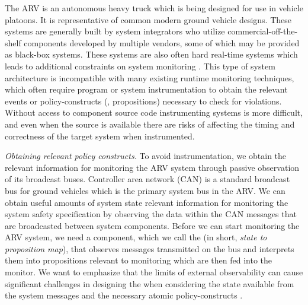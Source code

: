 The ARV is an autonomous heavy truck which is being designed for use in vehicle platoons. It is representative of common modern ground vehicle designs.
These systems are generally built by system integrators who utilize commercial-off-the-shelf components developed by multiple vendors, some of which may be provided as black-box systems.
These systems are also often hard real-time systems which leads to additional constraints on system monitoring \cite{Goodloe2010}.
This type of system architecture is incompatible with many existing runtime monitoring techniques, which often require program or system instrumentation \cite{Havelund2004, Chen2003, Bonakdarpour2012,Kim2004} to obtain the relevant events or policy-constructs (\eg, propositions) necessary to check for violations.
Without access to component source code instrumenting systems is more difficult, and even when the source is available there are risks of affecting the timing and correctness of the target system when instrumented.

\noindent
\textit{Obtaining relevant policy constructs.}
To avoid instrumentation, we obtain the relevant information for monitoring the ARV system through passive observation of
its broadcast buses. %
Controller area network (CAN) is a
standard broadcast bus for ground vehicles which is the primary system bus in the ARV. We can obtain useful amounts of system state relevant information for monitoring
the system safety specification by observing the data within the CAN messages that are broadcasted between system components.
Before we can start monitoring the ARV system, we need a component, which we call the \sfmap (in short, \emph{state to proposition map}), that observes messages transmitted on the bus and interprets
them into propositions relevant to monitoring which are then fed into the monitor.
We want to emphasize that the limits of external observability can cause significant challenges
in designing the \sfmap when considering the state available from the system messages and
the necessary atomic policy-constructs \cite{Kane2014}.

